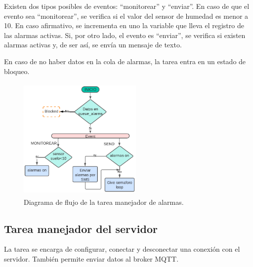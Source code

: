 Existen dos tipos posibles de eventos: ``monitorear'' y  ``enviar''. En caso de que el evento sea ``monitorear'', se verifica si el valor del sensor de humedad es menor a 10. En caso afirmativo, se incrementa en uno la variable que lleva el registro de las alarmas activas. Si, por otro lado, el evento es ``enviar'', se verifica si existen alarmas activas y, de ser así, se envía un mensaje de texto.

En caso de no haber datos en la cola de alarmas, la tarea entra en un estado de bloqueo.

\begin{figure}[h]
  \centering
	\includegraphics[width=6cm, height=6cm]{./Figures/DF_alarms.png}
	\caption{Diagrama de flujo de la tarea manejador de alarmas.}
	\label{fig:Df tarea alarmas}
\end{figure}

\subsection{Tarea manejador del servidor } 
La tarea se encarga de configurar, conectar y desconectar una conexión con el servidor. También permite enviar datos al broker MQTT. 

